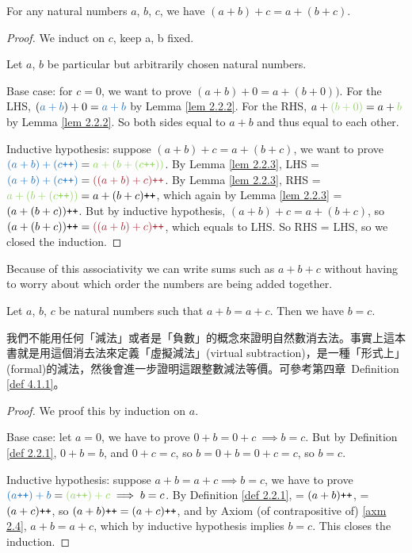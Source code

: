 \begin{proposition}\label{prop 2.2.5} For any natural numbers \(a\), \(b\), \(c\), we have \((a + b) + c = a + (b + c)\).
\end{proposition}
\begin{proof}
We induct on \(c\), keep a, b fixed.

Let \(a\), \(b\) be particular but arbitrarily chosen natural numbers.

Base case: for \(c = 0\), we want to prove \((a + b) + 0 = a + (b + 0))\). For the LHS, \((\BLUE{a + b}) + 0 = \BLUE{a + b}\) by Lemma \ref{lem 2.2.2}. For the RHS, \(a + \GREEN{(b + 0)} = a + \GREEN{b}\) by Lemma \ref{lem 2.2.2}. So both sides equal to \(a + b\) and thus equal to each other.

Inductive hypothesis: suppose \((a + b) + c = a + (b + c)\), we want to prove \(\BLUE{(a + b) + (c\INC)} = \GREEN{a + (b + (c\INC))}\). By Lemma \ref{lem 2.2.3}, LHS = \(\BLUE{(a + b) + (c\INC)} = \MAROON{((a + b) + c)\INC}\). By Lemma \ref{lem 2.2.3}, RHS = \(\GREEN{a + (b + (c\INC))} = a + (b + c)\INC\), which again by Lemma \ref{lem 2.2.3} = \((a + (b + c))\texttt{++}\). But by inductive hypothesis, \((a + b) + c = a + (b + c)\), so \((a + (b + c))\INC = \MAROON{((a + b) + c)\INC}\), which equals to LHS. So RHS = LHS, so we closed the induction.
\end{proof}

\begin{note}
Because of this associativity we can write sums such as \(a + b + c\) without having to worry about which order the numbers are being added together.
\end{note}

\begin{proposition}\label{prop 2.2.6} Let \(a\), \(b\), \(c\) be natural numbers such that \(a + b = a + c\). Then we have \(b = c\).
\end{proposition}
\begin{note}
我們不能用任何「減法」或者是「負數」的概念來證明自然數消去法。事實上這本書就是用這個消去法來定義「虛擬減法」(virtual subtraction)，是一種「形式上」(formal)的減法，然後會進一步證明這跟整數減法等價。可參考第四章\ Definition \ref{def 4.1.1}。
\end{note}
\begin{proof}
We proof this by induction on \(a\).

Base case: let \(a = 0\), we have to prove \(0 + b = 0 + c\ \implies b = c\). But by Definition \ref{def 2.2.1}, \(0 + b = b\), and \(0 + c = c\), so \(b = 0 + b = 0 + c = c\), so \(b = c\).

Inductive hypothesis: suppose \(a + b = a + c \implies b = c\), we have to prove \(\BLUE{(a\INC) + b} = \GREEN{(a\INC) + c} \implies b = c\). By Definition \ref{def 2.2.1},  = \((a + b)\texttt{++}\),  = \((a + c)\texttt{++}\), so \((a + b)\texttt{++} = (a + c)\texttt{++}\), and by Axiom (of contrapositive of) \ref{axm 2.4}, \(a + b = a + c\), which by inductive hypothesis implies \(b = c\). This closes the induction.
\end{proof}

